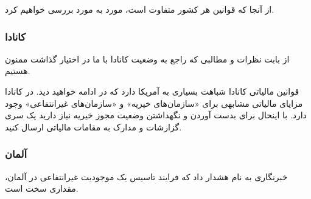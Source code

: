 از آنجا که قوانین هر کشور متفاوت است، مورد به مورد بررسی خواهیم کرد.
\subsubsection{کانادا}
از
بابت نظرات و مطالبی که راجع به وضعیت کانادا با ما در اختیار گذاشت ممنون هستیم.


قوانین مالیاتی کانادا شباهت بسیاری به آمریکا دارد که در ادامه خواهید دید.
در کانادا مزایای مالیاتی مشابهی برای «سازمان‌های خیریه» و «سازمان‌های غیرانتفاعی»
وجود دارد. با اینحال برای بدست آوردن و نگهداشتن وضعیت مجوز خیریه نیاز دارید
یک سری گزارشات و مدارک به مقامات مالیاتی ارسال کنید.

\subsubsection{آلمان}

خبرنگاری به نام
هشدار داد که فرایند تاسیس یک موجودیت غیرانتفاعی در آلمان، مقداری سخت است.

